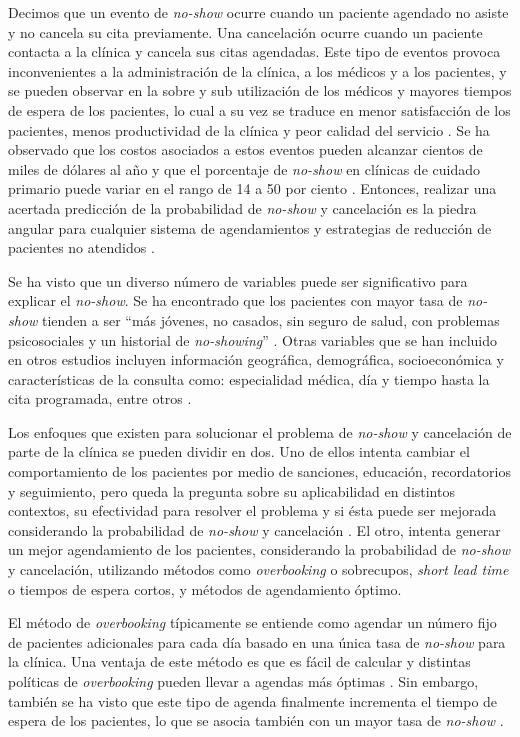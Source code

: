 Decimos que un evento de \textit{no-show} ocurre cuando un paciente agendado no asiste y no cancela su cita previamente. Una cancelación ocurre cuando un paciente contacta a la clínica y cancela sus citas agendadas. Este tipo de eventos provoca inconvenientes a la administración de la clínica, a los médicos y a los pacientes, y se pueden observar en la sobre y sub utilización de los médicos y mayores tiempos de espera de los pacientes, lo cual a su vez se traduce en menor satisfacción de los pacientes, menos productividad de la clínica y peor calidad del servicio \cite{daggy2010}. Se ha observado que los costos asociados a estos eventos pueden alcanzar cientos de miles de dólares al año \cite{alaeddini2015} y que el porcentaje de \textit{no-show} en clínicas de cuidado primario puede variar en el rango de 14 a 50 por ciento \cite{daggy2010}. Entonces, realizar una acertada predicción de la probabilidad de \textit{no-show} y cancelación es la piedra angular para cualquier sistema de agendamientos y estrategias de reducción de pacientes no atendidos \cite{alaeddini2015}.

Se ha visto que un diverso número de variables puede ser significativo para explicar el \textit{no-show}. Se ha encontrado que los pacientes con mayor tasa de \textit{no-show} tienden a ser “más jóvenes, no casados, sin seguro de salud, con problemas psicosociales y un historial de \textit{no-showing}” \cite{daggy2010}. Otras variables que se han incluido en otros estudios incluyen información geográfica, demográfica, socioeconómica y características de la consulta como: especialidad médica, día y tiempo hasta la cita programada, entre otros \cite{alaeddini2015, daggy2010,goldman1982}.

Los enfoques que existen para solucionar el problema de \textit{no-show} y cancelación de parte de la clínica se pueden dividir en dos. Uno de ellos intenta cambiar el comportamiento de los pacientes por medio de sanciones, educación, recordatorios y seguimiento, pero queda la pregunta sobre su aplicabilidad en distintos contextos, su efectividad para resolver el problema y si ésta puede ser mejorada considerando la probabilidad de \textit{no-show} y cancelación \cite{daggy2010}. El otro, intenta generar un mejor agendamiento de los pacientes, considerando la probabilidad de \textit{no-show} y cancelación, utilizando métodos como \textit{overbooking} o sobrecupos, \textit{short lead time} o tiempos de espera cortos,  y métodos de agendamiento óptimo.


El método de \textit{overbooking} típicamente se entiende como agendar un número fijo de pacientes adicionales para cada día basado en una única tasa de \textit{no-show} para la clínica. Una ventaja de este método es que es fácil de calcular y distintas políticas de \textit{overbooking} pueden llevar a agendas más óptimas \cite{berg2013}. Sin embargo, también se ha visto que este tipo de agenda finalmente incrementa el tiempo de espera de los pacientes, lo que se asocia también con un mayor tasa de \textit{no-show} \cite{daggy2010}.



